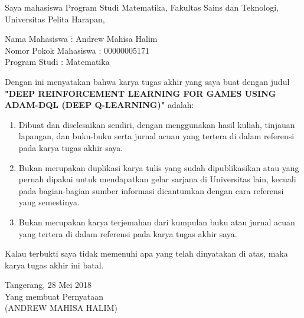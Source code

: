 \noindent
Saya mahasiswa Program Studi Matematika, Fakultas Sains dan Teknologi, Universitas Pelita Harapan,
\begin{tabbing}
Nama Mahasiswa \hspace{1.75cm}\= : Andrew Mahisa Halim\\
Nomor Pokok Mahasiswa \> : 00000005171\\
Program Studi \> : Matematika
\end{tabbing}
Dengan ini menyatakan bahwa karya tugas akhir yang saya buat dengan judul \newline \textbf{"DEEP REINFORCEMENT LEARNING FOR GAMES USING ADAM-DQL (DEEP Q-LEARNING)"} \newline
\noindent adalah:
\begin{enumerate}
\item Dibuat dan diselesaikan sendiri, dengan menggunakan hasil kuliah, tinjauan lapangan, dan buku-buku serta jurnal acuan yang tertera di dalam referensi pada karya tugas akhir saya.
\item Bukan merupakan duplikasi karya tulis yang sudah dipublikasikan atau yang pernah dipakai untuk mendapatkan gelar sarjana di Universitas lain, kecuali pada bagian-bagian sumber informasi dicantumkan dengan cara referensi yang semestinya.
\item Bukan merupakan karya terjemahan dari kumpulan buku atau jurnal acuan yang tertera di dalam referensi pada karya tugas akhir saya.
\end{enumerate}
Kalau terbukti saya tidak memenuhi apa yang telah dinyatakan di atas, maka karya tugas akhir ini batal.

\begin{flushright}
Tangerang, 28 Mei 2018 \\
Yang membuat Pernyataan\\\vspace{2.5cm}
(ANDREW MAHISA HALIM)
\end{flushright} 